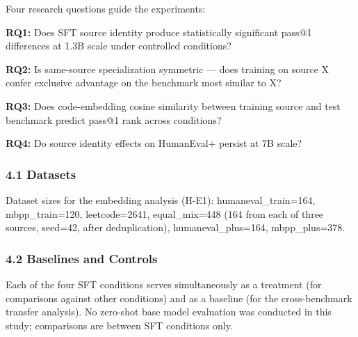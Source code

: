 
Four research questions guide the experiments:

\textbf{RQ1:} Does SFT source identity produce statistically significant pass@1 differences at 1.3B scale under controlled conditions?

\textbf{RQ2:} Is same-source specialization symmetric --- does training on source X confer exclusive advantage on the benchmark most similar to X?

\textbf{RQ3:} Does code-embedding cosine similarity between training source and test benchmark predict pass@1 rank across conditions?

\textbf{RQ4:} Do source identity effects on HumanEval+ persist at 7B scale?

\subsubsection{4.1 Datasets}

\begin{table}[htbp]
\centering
{}
\end{table}

Dataset sizes for the embedding analysis (H-E1): humaneval\_train=164, mbpp\_train=120, leetcode=2641, equal\_mix=448 (164 from each of three sources, seed=42, after deduplication), humaneval\_plus=164, mbpp\_plus=378.

\subsubsection{4.2 Baselines and Controls}

Each of the four SFT conditions serves simultaneously as a treatment (for comparisons against other conditions) and as a baseline (for the cross-benchmark transfer analysis). No zero-shot base model evaluation was conducted in this study; comparisons are between SFT conditions only.

